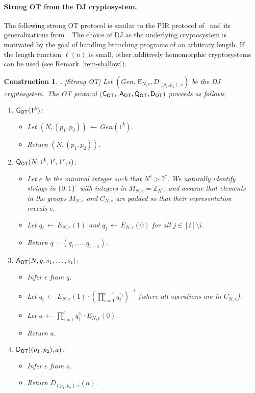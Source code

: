 \documentclass[11pt]{article}
\newcommand{\genot}{{\sf G_{OT}}}
\newcommand{\queot}{{\sf Q_{OT}}}
\newcommand{\ansot}{{\sf A_{OT}}}
\newcommand{\decot}{{\sf D_{OT}}}
\newcommand{\otl}{{\tau}}
\newcommand{\gendj}{Gen}
\newcommand{\encdj}{{E}_{N,e}}
\newcommand{\decdj}{{D}_{(p_1,p_2),e}}
\newcommand{\size}[1]{|#1|}
\newcommand{\Z}{{\mathbb{Z}}}
\newtheorem{CONSTRUCTION}{Construction}[section]
\newenvironment{construction}{\begin{CONSTRUCTION} \hspace{-.85em} {\bf .} \rm}%
	{\end{CONSTRUCTION}}
\newcommand{\from}{{\,\leftarrow\,}}
\newcommand{\opbrange}[3][,]{#2#1\ldots#1#3}
\begin{document}
\paragraph{\bf Strong OT from the DJ cryptosystem.}
The following strong OT protocol is similar to the PIR protocol
of~\cite{KO97} and its generalizations
from~\cite{Ste98,L04}.
The choice of DJ as the underlying cryptosystem is
motivated by the goal of handling branching programs of an
arbitrary length. If the length function $\ell(n)$ is small, other additively
homomorphic cryptosystems can be used (see
Remark~\ref{rem-shallow}).
\begin{construction}[Strong OT]
\rm \label{con-otimpl-smh} Let $(\gendj,\encdj,\decdj)$ be the DJ
cryptosystem. The OT protocol $(\genot,$ $\ansot,\queot,\decot)$
proceeds as follows.
\begin{enumerate}
\item $\genot(1^k)$:
\begin{itemize}
\item Let $(N,(p_1,p_2))\from\gendj(1^k)$.
\item Return $(N,(p_1,p_2))$.
\end{itemize}
\item $\queot(N,1^k,1^t,1^{\otl},i)$:
\begin{itemize}
\item Let $e$ be the minimal integer such that $N^e > 2^\otl$. We
naturally identify strings in $\{0,1\}^\otl$ with integers in
$M_{N,e}=\Z_{N^e}$, and assume that elements in the groups
$M_{N,e}$ and $C_{N,e}$ are padded so that their representation
reveals $e$.
\item Let $q_i\from\encdj(1)$ and $q_j\from\encdj(0)$ for all
$j\in[t]\setminus i$.
\item Return $q=(q_1,\ldots,q_{t-1})$.
\end{itemize}
\item $\ansot(N,q,\opbrange{s_1}{s_t})$:
\begin{itemize}
\item Infer $e$ from $q$.
\item Let $q_t\from\encdj(1)\cdot
(\prod_{i=1}^{t-1}{q_i^{s_i}})^{-1}$ (where all operations are in
$C_{N,e}$).
\item Let $a\from\prod_{i=1}^t q_i^{s_i}\cdot\encdj(0)$.
\item Return $a$.
\end{itemize}
\item $\decot((p_1,p_2),a)$:
\begin{itemize}
\item Infer $e$ from $a$.
\item Return $\decdj(a)$.
\end{itemize}
\end{enumerate}
\end{construction}
\end{document}
